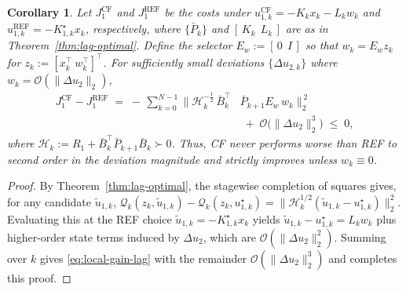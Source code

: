 \documentclass[letterpaper, 10 pt, conference]{ieeeconf}  %
\newtheorem{corollary}[theorem]{\textbf{Corollary}}
\begin{document}
\begin{corollary}
\label{cor:local-gain-lag}
Let $J_1^{\mathrm{CF}}$ and $J_1^{\mathrm{REF}}$ be the costs under
$u_{1,k}^{\mathrm{CF}}=-K_k x_k - L_k w_k$ and
$u_{1,k}^{\mathrm{REF}}=-K^{\star}_{1,k} x_k$, respectively, where
$\{\bar P_k\}$ and $[\,K_k\ \ L_k\,]$ are as in Theorem~\ref{thm:lag-optimal}.
Define the selector $E_w:=[\,0\ \ I\,]$ so that $w_k=E_w z_k$ for
$z_k:=[x_k^\top\ w_k^\top]^\top$. For sufficiently small deviations
$\{\Delta u_{2,k}\}$ where $w_k=\mathcal{O}(\|\Delta u_2\|_2)$,
\begin{equation}\label{eq:local-gain-lag}
\begin{aligned}
J_1^{\mathrm{CF}} - J_1^{\mathrm{REF}}
\;=\;
-\,\sum_{k=0}^{N-1} \Big\| \mathcal{H}_k^{-\tfrac12}
\,\bar B_k^\top &\bar P_{k+1} E_w\, w_k \Big\|_2^{\,2}\\
&\;+\; \mathcal{O}\!\big(\|\Delta u_2\|_2^3\big)
\;\le\; 0,
\end{aligned}
\end{equation}
where $\displaystyle \mathcal{H}_k:=R_1+\bar B_k^\top \bar P_{k+1}\bar B_k \succ 0$. Thus, CF never performs worse than REF to second order in the deviation magnitude and strictly improves unless $w_k\equiv0$.
\end{corollary}
\begin{proof}
By Theorem~\ref{thm:lag-optimal}, the stagewise completion of squares gives, for any
candidate $\tilde u_{1,k}$,
$\mathcal{Q}_k(z_k,\tilde u_{1,k})-\mathcal{Q}_k(z_k,u_{1,k}^\star)
=\|\mathcal{H}_k^{1/2}(\tilde u_{1,k}-u_{1,k}^\star)\|_2^2$.
Evaluating this at the REF choice $\tilde u_{1,k}=-K_{1,k}^\star x_k$ yields
$\tilde u_{1,k}-u_{1,k}^\star= L_k w_k$ plus higher-order state terms induced by
$\Delta u_2$, which are $\mathcal{O}(\|\Delta u_2\|_2^2)$. Summing over $k$ gives
\eqref{eq:local-gain-lag} with the remainder $\mathcal{O}(\|\Delta u_2\|_2^3)$ and completes this proof.
\end{proof}



\end{document}
